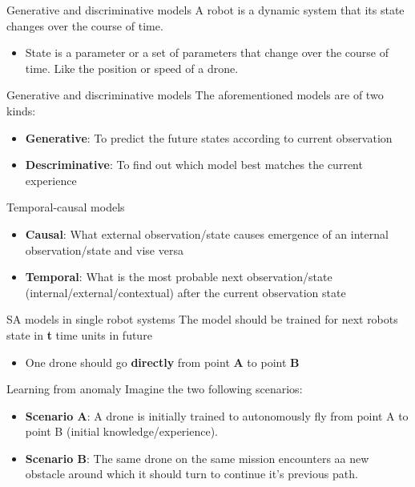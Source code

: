 \documentclass[unknownkeysallowed]{beamer}
\begin{document}
	\begin{frame}{Generative and discriminative models}
		A robot is a dynamic system that its state changes over the course of time.
		\begin{itemize}
			\item State is a parameter or a set of parameters that change over the course of time. Like the position or speed of a drone.
		\end{itemize}
	\end{frame}

	\begin{frame}{Generative and discriminative models}
		The aforementioned models are of two kinds:
		\begin{itemize}
			\item \textbf{Generative}: To predict the future states according to current observation
			\item \textbf{Descriminative}: To find out which model best matches the current experience
		\end{itemize}
	\end{frame}

	\begin{frame}{Temporal-causal models}
		\begin{itemize}
			\item \textbf{Causal}: What external observation/state causes emergence of an internal observation/state and vise versa
			\item \textbf{Temporal}: What is the most probable next observation/state (internal/external/contextual) after the current observation state
		\end{itemize}
	\end{frame}

	\begin{frame}{SA models in single robot systems}
		The model should be trained for next robots state in \textbf{t} time units in future
		\begin{itemize}
			\item One drone should go \textbf{directly} from point \textbf{A} to point \textbf{B}
		\end{itemize}
	\end{frame}

	\begin{frame}{Learning from anomaly}
		Imagine the two following scenarios:
		\begin{itemize}
			\item \textbf{Scenario A}: A drone is initially trained to autonomously fly from point A to point B (initial knowledge/experience).
			\item \textbf{Scenario B}: The same drone on the same mission encounters aa new obstacle around which it should turn to continue it's previous path. 
		\end{itemize}
	\end{frame}
\end{document}
